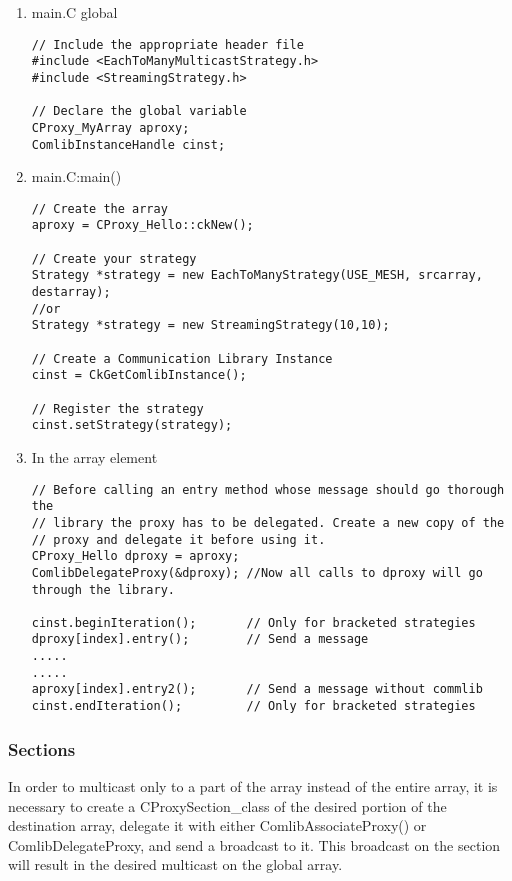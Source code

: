 \begin{enumerate}
\item main.C global
\begin{verbatim}
// Include the appropriate header file
#include <EachToManyMulticastStrategy.h>
#include <StreamingStrategy.h>

// Declare the global variable
CProxy_MyArray aproxy;
ComlibInstanceHandle cinst;
\end{verbatim}

\item main.C:main()
\begin{verbatim}
// Create the array
aproxy = CProxy_Hello::ckNew();

// Create your strategy
Strategy *strategy = new EachToManyStrategy(USE_MESH, srcarray, destarray);
//or
Strategy *strategy = new StreamingStrategy(10,10);

// Create a Communication Library Instance
cinst = CkGetComlibInstance();

// Register the strategy
cinst.setStrategy(strategy);
\end{verbatim}

\item In the array element 
\begin{verbatim}
// Before calling an entry method whose message should go thorough the
// library the proxy has to be delegated. Create a new copy of the
// proxy and delegate it before using it.
CProxy_Hello dproxy = aproxy;
ComlibDelegateProxy(&dproxy); //Now all calls to dproxy will go through the library.

cinst.beginIteration();       // Only for bracketed strategies
dproxy[index].entry();        // Send a message
.....
.....
aproxy[index].entry2();       // Send a message without commlib
cinst.endIteration();         // Only for bracketed strategies
\end{verbatim}
\end{enumerate}

\subsubsection{Sections}

In order to multicast only to a part of the array instead of the entire array,
it is necessary to create a {\textrm{CProxySection\_class}} of the desired
portion of the destination array, delegate it with either
{\textrm{ComlibAssociateProxy()}} or {\textrm{ComlibDelegateProxy}}, and send a
broadcast to it. This broadcast on the section will result in the desired
multicast on the global array.

